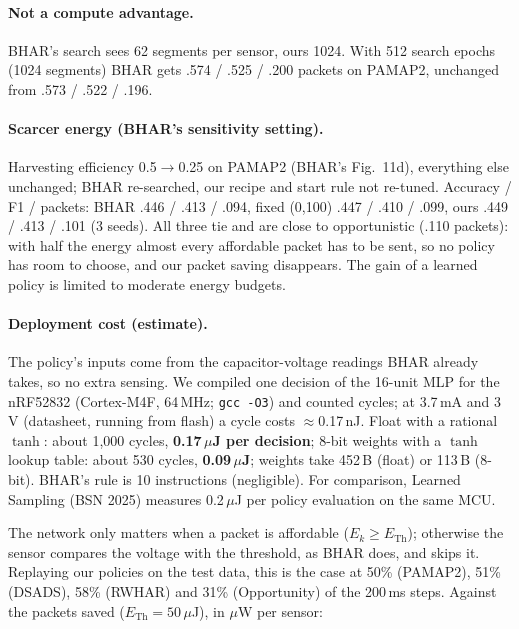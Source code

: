 \documentclass[10pt]{article}
\newcommand{\Eth}{E_{\mathrm{Th}}}
\begin{document}
\paragraph{Not a compute advantage.} BHAR's search sees 62 segments per sensor, ours 1024. With 512 search epochs (1024 segments) BHAR gets .574 / .525 / .200 packets on PAMAP2, unchanged from .573 / .522 / .196.

\paragraph{Scarcer energy (BHAR's sensitivity setting).} Harvesting efficiency 0.5$\to$0.25 on PAMAP2 (BHAR's Fig.~11d), everything else unchanged; BHAR re-searched, our recipe and start rule not re-tuned. Accuracy / F1 / packets: BHAR .446 / .413 / .094, fixed (0,100) .447 / .410 / .099, ours .449 / .413 / .101 (3 seeds). All three tie and are close to opportunistic (.110 packets): with half the energy almost every affordable packet has to be sent, so no policy has room to choose, and our packet saving disappears. The gain of a learned policy is limited to moderate energy budgets.

\paragraph{Deployment cost (estimate).} The policy's inputs come from the capacitor-voltage readings BHAR already takes, so no extra sensing. We compiled one decision of the 16-unit MLP for the nRF52832 (Cortex-M4F, 64\,MHz; \texttt{gcc -O3}) and counted cycles; at 3.7\,mA and 3\,V (datasheet, running from flash) a cycle costs $\approx$0.17\,nJ. Float with a rational $\tanh$: about 1{,}000 cycles, \textbf{0.17\,$\mu$J per decision}; 8-bit weights with a $\tanh$ lookup table: about 530 cycles, \textbf{0.09\,$\mu$J}; weights take 452\,B (float) or 113\,B (8-bit). BHAR's rule is 10 instructions (negligible). For comparison, Learned Sampling (BSN 2025) measures 0.2\,$\mu$J per policy evaluation on the same MCU.

The network only matters when a packet is affordable ($E_k \ge \Eth$); otherwise the sensor compares the voltage with the threshold, as BHAR does, and skips it. Replaying our policies on the test data, this is the case at 50\% (PAMAP2), 51\% (DSADS), 58\% (RWHAR) and 31\% (Opportunity) of the 200\,ms steps. Against the packets saved ($\Eth = 50$\,$\mu$J), in $\mu$W per sensor:
\end{document}

